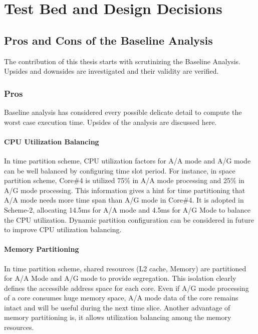 \chapter{Test Bed and Design Decisions}
\label{chap:testbed}

\section{Pros and Cons of the Baseline Analysis}
\label{sec:mm:pros_n_cons}
The contribution of this thesis starts with scrutinizing the Baseline Analysis. Upsides and downsides are investigated and their validity are verified.
\subsection{Pros}
\label{mm:pros}
Baseline analysis has considered every possible delicate detail to compute the worst case execution time. Upsides of the analysis are discussed here.

\subsubsection{CPU Utilization Balancing}
In time partition scheme, CPU utilization factors for A/A mode and A/G mode can be well balanced by configuring time slot period. For instance, in space partition scheme, Core\#4 is utilized 75\% in A/A mode processing and 25\% in A/G mode processing. This information gives a hint for time partitioning that A/A mode needs more time span than A/G mode in Core\#4. It is adopted in Scheme-2, allocating 14.5ms for A/A mode and 4.5ms for A/G Mode to balance the CPU utilization. Dynamic partition configuration can be considered in future to improve CPU utilization balancing.

\subsubsection{Memory Partitioning}
In time partition scheme, shared resources (L2 cache, Memory) are partitioned for A/A Mode and A/G mode to provide segregation. This isolation clearly defines the accessible address space for each core. Even if A/G mode processing of a core consumes huge memory space, A/A mode data of the core remains intact and will be useful during the next time slice. Another advantage of memory partitioning is, it allows utilization balancing among the memory resources.


